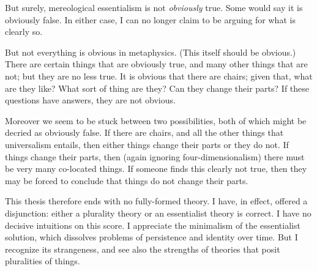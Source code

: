 \documentclass[11pt]{article}
\begin{document}
\begin{spacing}{1.5}
But surely, mereological essentialism is not {\em obviously} true.
Some would say it is obviously false.  In either case, I can no longer
claim to be arguing for what is clearly so.

But not everything is obvious in metaphysics.  (This itself should be
obvious.)  There are certain things that are obviously true, and many
other things that are not; but they are no less true.  It is obvious
that there are chairs; given that, what are they like?  What sort of
thing are they?  Can they change their parts?  If these questions have
answers, they are not obvious.

Moreover we seem to be stuck between two possibilities, both of which
might be decried as obviously false.  If there are chairs, and all the
other things that universalism entails, then either things change
their parts or they do not.  If things change their parts, then (again
ignoring four-dimensionalism) there must be very many co-located
things.  If someone finds this clearly not true, then they may be
forced to conclude that things do not change their parts.

This thesis therefore ends with no fully-formed theory.  I have, in
effect, offered a disjunction: either a plurality theory or an
essentialist theory is correct. I have no decisive intuitions on this
score.  I appreciate the minimalism of the essentialist solution,
which dissolves problems of persistence and identity over time.  But I
recognize its strangeness, and see also the strengths of theories that
posit pluralities of things.

\ifstandalone
\end{spacing}


\fi
\end{document}
